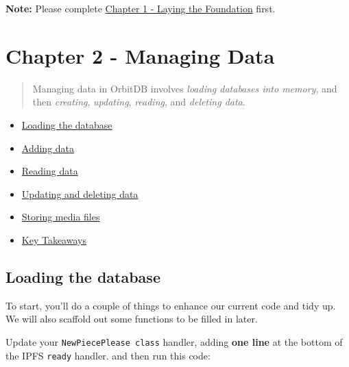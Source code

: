 \textbf{Note:} Please complete \href{./01_Basics.md}{Chapter 1 - Laying
the Foundation} first.

\section{Chapter 2 - Managing Data}\label{chapter-2---managing-data}

\begin{quote}
Managing data in OrbitDB involves \emph{loading databases into memory},
and then \emph{creating}, \emph{updating}, \emph{reading}, and
\emph{deleting data}.
\end{quote}

\begin{itemize}
\tightlist
\item
  \protect\hyperlink{loading-the-database}{Loading the database}
\item
  \protect\hyperlink{adding-data}{Adding data}
\item
  \protect\hyperlink{reading-data}{Reading data}
\item
  \protect\hyperlink{updating-and-deleting-data}{Updating and deleting
  data}
\item
  \protect\hyperlink{storing-media-files}{Storing media files}
\item
  \protect\hyperlink{key-takeaways}{Key Takeaways}
\end{itemize}

\hypertarget{loading-the-database}{\subsection{Loading the
database}\label{loading-the-database}}

To start, you'll do a couple of things to enhance our current code and
tidy up. We will also scaffold out some functions to be filled in later.

Update your \texttt{NewPiecePlease\ class} handler, adding \textbf{one
line} at the bottom of the IPFS \texttt{ready} handler. and then run
this code:

